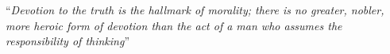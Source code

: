 \documentclass[
openright,
12pt, %
english,%
onehalfspacing, %
nolistspacing, %
nohyperref, %
headsepline, %
]{MastersDoctoralThesis} %
\begin{document}

%    
%    
%    



\vspace*{0.2\textheight}

\noindent\enquote{\itshape Devotion to the truth is the hallmark of morality; there is no greater, nobler, more heroic form of devotion than the act of a man who assumes the responsibility of thinking}\bigbreak
\end{document}
